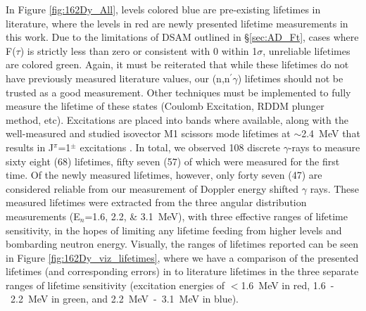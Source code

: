In Figure \ref{fig:162Dy_All}, levels colored blue are pre-existing lifetimes in literature, where the levels in red are newly presented lifetime measurements in this work. Due to the limitations of DSAM outlined in \S \ref{sec:AD_Ft}, cases where F($\tau$) is strictly less than zero or consistent with 0 within 1$\sigma$, unreliable lifetimes are colored green. Again, it must be reiterated that while these lifetimes do not have previously measured literature values, our (n,n$^\prime\gamma$) lifetimes should not be trusted as a good measurement. Other techniques must be implemented to fully measure the lifetime of these states (Coulomb Excitation, RDDM plunger method, etc). Excitations are placed into bands where available, along with the well-measured and studied isovector M1 scissors mode lifetimes at $\sim$2.4~MeV that results in J$^\pi$=1$^{\pm}$ excitations \cite{Margraf_gg'NRF_1995, WESSELBORG198822,Yates_162nnp1995}. In total, we observed 108 discrete $\gamma$-rays to measure sixty eight (68) lifetimes, fifty seven (57) of which were measured for the first time. Of the newly measured lifetimes, however, only forty seven (47) are considered reliable from our measurement of Doppler energy shifted $\gamma$ rays. These measured lifetimes were extracted from the three angular distribution measurements (E$_n$=1.6, 2.2, \& 3.1~MeV), with three effective ranges of lifetime sensitivity, in the hopes of limiting any lifetime feeding from higher levels and bombarding neutron energy. Visually, the ranges of lifetimes reported can be seen in Figure \ref{fig:162Dy_viz_lifetimes}, where we have a comparison of the presented lifetimes (and corresponding errors) in to literature lifetimes in the three separate ranges of lifetime sensitivity (excitation energies of $<$1.6~MeV in red, 1.6~-~2.2~MeV in green, and 2.2~MeV~-~3.1~MeV in blue). 


